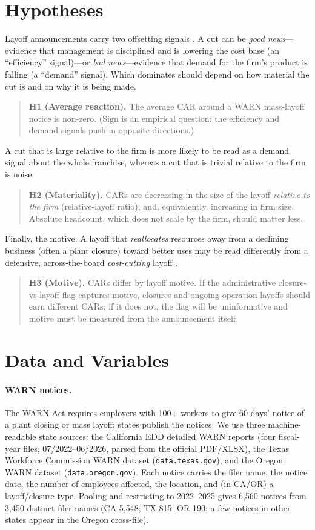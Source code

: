 \documentclass[12pt]{article}
\begin{document}
\section{Hypotheses}\label{sec:hyp}
Layoff announcements carry two offsetting signals \citep{palmon1997,chen2001}. A
cut can be \emph{good news}---evidence that management is disciplined and is
lowering the cost base (an ``efficiency'' signal)---or \emph{bad news}---evidence
that demand for the firm's product is falling (a ``demand'' signal). Which
dominates should depend on how material the cut is and on why it is being made.
\begin{quote}
\textbf{H1 (Average reaction).} The average CAR around a WARN mass-layoff notice
is non-zero. (Sign is an empirical question: the efficiency and demand signals
push in opposite directions.)
\end{quote}
A cut that is large relative to the firm is more likely to be read as a demand
signal about the whole franchise, whereas a cut that is trivial relative to the
firm is noise.
\begin{quote}
\textbf{H2 (Materiality).} CARs are decreasing in the size of the layoff
\emph{relative to the firm} (relative-layoff ratio), and, equivalently,
increasing in firm size. Absolute headcount, which does not scale by the firm,
should matter less.
\end{quote}
Finally, the motive. A layoff that \emph{reallocates} resources away from a
declining business (often a plant closure) toward better uses may be read
differently from a defensive, across-the-board \emph{cost-cutting} layoff
\citep{love2005,nixon2004}.
\begin{quote}
\textbf{H3 (Motive).} CARs differ by layoff motive. If the administrative
closure-vs-layoff flag captures motive, closures and ongoing-operation layoffs
should earn different CARs; if it does not, the flag will be uninformative and
motive must be measured from the announcement itself.
\end{quote}

\section{Data and Variables}\label{sec:data}
\paragraph{WARN notices.} The WARN Act requires employers with 100+ workers to
give 60 days' notice of a plant closing or mass layoff; states publish the
notices. We use three machine-readable state sources: the California EDD detailed
WARN reports (four fiscal-year files, 07/2022--06/2026, parsed from the official
PDF/XLSX), the Texas Workforce Commission WARN dataset
(\texttt{data.texas.gov}), and the Oregon WARN dataset (\texttt{data.oregon.gov}).
Each notice carries the filer name, the notice date, the number of employees
affected, the location, and (in CA/OR) a layoff/closure type. Pooling and
restricting to 2022--2025 gives 6{,}560 notices from 3{,}450 distinct filer names
(CA 5{,}548; TX 815; OR 190; a few notices in other states appear in the Oregon
cross-file).
\end{document}
